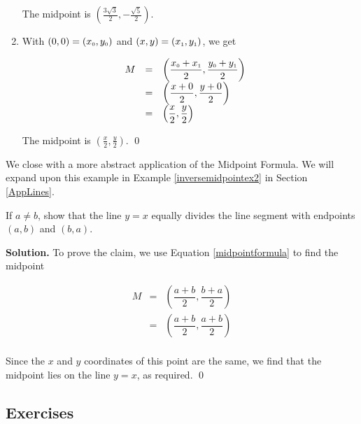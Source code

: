 \begin{ex}
\begin{enumerate}
   The midpoint is $\left(\frac{3\sqrt{3}}{2}, -\frac{\sqrt{5}}{2} \right)$.

\item With $(0,0) =  \left(x_{\mbox{\tiny$0$}}, y_{\mbox{\tiny$0$}}\right)$ and  $(x,y) = \left(x_{\mbox{\tiny$1$}}, y_{\mbox{\tiny$1$}}\right)$, we get

\setlength{\extrarowheight}{10pt}

\[ \begin{array}{rclr}
 M & = & \left( \dfrac{x_{\mbox{\tiny$0$}}+x_{\mbox{\tiny$1$}}}{2},  \dfrac{y_{\mbox{\tiny$0$}}+y_{\mbox{\tiny$1$}}}{2} \right) & \\
   & = & \left( \dfrac{x+0}{2},  \dfrac{y+0}{2} \right) &   \\
   & = &  \left( \dfrac{x}{2},  \dfrac{y}{2} \right) &  \end{array} \]
   
 The midpoint is $\left(\frac{x}{2}, \frac{y}{2} \right)$. \qed

\end{enumerate}

\end{ex}


\label{inversemidpoint}

We close with a more abstract application of the Midpoint Formula.  We will expand upon this example in Example \ref{inversemidpointex2} in Section \ref{AppLines}.  

\begin{ex} \label{inversemidpointex1} If $a \neq b$, show that the line $y = x$ equally divides the line segment with endpoints $(a,b)$ and $(b,a)$.

\medskip

{\bf Solution.}  To prove the claim, we use Equation \ref{midpointformula} to find the midpoint  

\setlength{\extrarowheight}{10pt}

\[ \begin{array}{rcl}

 M & = & \left( \dfrac{a+b}{2},  \dfrac{b+a}{2} \right) \\
   & = & \left( \dfrac{a+b}{2},  \dfrac{a+b}{2} \right)  \\ \end{array} \]

Since the $x$ and $y$ coordinates of this point are the same, we find that the midpoint lies on the line $y=x$, as required. \qed

\end{ex}

\setlength{\extrarowheight}{2pt}

\newpage

\subsection{Exercises}



\closegraphsfile